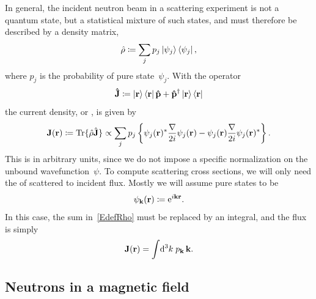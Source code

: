 In general, the incident neutron beam in a scattering experiment
is not a  quantum state,
%
%
but a statistical mixture of such states,
%
and must therefore be described by a density matrix,
%
%
\begin{equation}\label{EdefRho}
  \hat\rho \coloneqq \sum_j p_j \ket{\psi_j}\bra{\psi_j},
\end{equation}
where $p_j$ is the probability of pure state~$\psi_j$.
%
With the operator
\begin{equation}\label{EdefJop}
  \mathbf{\hat J} \coloneqq  \ket{\mathbf{r}}\bra{\mathbf{r}}\mathbf{\hat p} + \mathbf{\hat p}^\dagger\ket{\mathbf{r}}\bra{\mathbf{r}}
\end{equation}
the current density, or ,
%
%
is given by
\begin{equation}\label{EdefJ}
  \mathbf{J}(\mathbf{r})
  \coloneqq \operatorname{Tr}\{\hat\rho \hat{\mathbf{J}}\}
  \propto \sum_j p_j\left\{ \psi_j(\mathbf{r})^*\frac{\mathbf{\nabla}}{2i}\psi_j(\mathbf{r})
                        - \psi_j(\mathbf{r})\frac{\mathbf{\nabla}}{2i}\psi_j(\mathbf{r})^*\right\}.
\end{equation}
%
This is in arbitrary units,
%
since we do not impose a specific normalization
%
on the unbound wavefunction~$\psi$.
To compute scattering cross sections,
%
%
we will only need the  of scattered to incident flux.
Mostly we will assume pure states to be 
%
%
\begin{equation}\label{EplaneWave}
  \psi_{\mathbf{k}}(\mathbf{r})\coloneqq\mathrm e^{i\mathbf{k}\mathbf{r}}.
\end{equation}
In this case, the sum in~\cref{EdefRho} must be replaced by an integral,
and the flux is simply
\begin{equation}
  \mathbf{J}(\mathbf{r}) = \int\!\mathrm d^3k\; p_{\mathbf{k}}\, \mathbf{k}.
\end{equation}

\subsection{Neutrons in a magnetic field}\label{SnSpinor}

